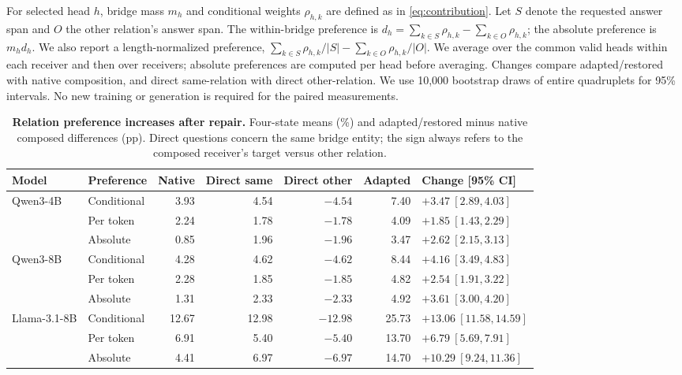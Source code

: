 For selected head $h$, bridge mass $m_h$ and conditional weights $\rho_{h,k}$ are defined as in \cref{eq:contribution}. Let $S$ denote the requested answer span and $O$ the other relation's answer span. The within-bridge preference is $d_h=\sum_{k\in S}\rho_{h,k}-\sum_{k\in O}\rho_{h,k}$; the absolute preference is $m_h d_h$. We also report a length-normalized preference, $\sum_{k\in S}\rho_{h,k}/|S|-\sum_{k\in O}\rho_{h,k}/|O|$. We average over the common valid heads within each receiver and then over receivers; absolute preferences are computed per head before averaging. Changes compare adapted/restored with native composition, and direct same-relation with direct other-relation. We use 10,000 bootstrap draws of entire quadruplets for 95\% intervals. No new training or generation is required for the paired measurements.

\begin{table}[!htbp]
\centering
\caption{\textbf{Relation preference increases after repair.} Four-state means (\%) and adapted/restored minus native composed differences (pp). Direct questions concern the same bridge entity; the sign always refers to the composed receiver's target versus other relation.}
\label{tab:postrepair_reading}
\small
\begin{tabular}{llrrrrl}
\toprule
Model & Preference & Native & Direct same & Direct other & Adapted & Change [95\% CI] \\
\midrule
Qwen3-4B & Conditional & 3.93 & 4.54 & $-4.54$ & 7.40 & $+3.47\ [2.89,4.03]$ \\
 & Per token & 2.24 & 1.78 & $-1.78$ & 4.09 & $+1.85\ [1.43,2.29]$ \\
 & Absolute & 0.85 & 1.96 & $-1.96$ & 3.47 & $+2.62\ [2.15,3.13]$ \\
\midrule
Qwen3-8B & Conditional & 4.28 & 4.62 & $-4.62$ & 8.44 & $+4.16\ [3.49,4.83]$ \\
 & Per token & 2.28 & 1.85 & $-1.85$ & 4.82 & $+2.54\ [1.91,3.22]$ \\
 & Absolute & 1.31 & 2.33 & $-2.33$ & 4.92 & $+3.61\ [3.00,4.20]$ \\
\midrule
Llama-3.1-8B & Conditional & 12.67 & 12.98 & $-12.98$ & 25.73 & $+13.06\ [11.58,14.59]$ \\
 & Per token & 6.91 & 5.40 & $-5.40$ & 13.70 & $+6.79\ [5.69,7.91]$ \\
 & Absolute & 4.41 & 6.97 & $-6.97$ & 14.70 & $+10.29\ [9.24,11.36]$ \\
\bottomrule
\end{tabular}
\end{table}

